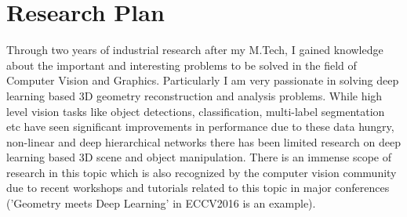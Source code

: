 \documentclass{article}
\begin{document}
	
	\vspace*{-0.25cm}
	\section{Research Plan}
	\vspace*{-0.25cm}
	Through two years of industrial research after my M.Tech, I gained knowledge about the important and interesting problems to be solved in the field of Computer Vision and Graphics. Particularly I am very passionate in solving deep learning based 3D geometry reconstruction and analysis problems. While high level vision tasks like object detections, classification, multi-label segmentation etc have seen significant improvements in performance due to these data hungry, non-linear and deep hierarchical networks there has been limited research on deep learning based 3D scene and object manipulation. There is an immense scope of research in this topic which is also recognized by the computer vision community due to recent workshops and tutorials related to this topic in major conferences ('Geometry meets Deep Learning' in ECCV2016 is an example). 
\end{document}
